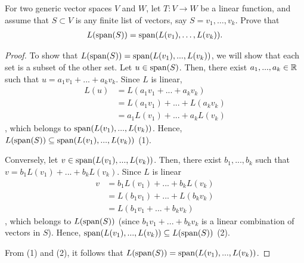 \begin{question}\label{que:LOfSpan}
	\normalfont
	
	For two generic vector spaces $V$ and $W$, let $T:V\to W$ be a linear function, and assume that $S\subset V$ is any finite list of vectors, say $S=v_1,\dots, v_k$.  Prove that
	\begin{align*}
		L(\textnormal{span}(S)) = \textnormal{span}(L(v_1),\dots, L(v_k) ). 
	\end{align*}
\end{question}

\begin{proof}
	\renewcommand{\qedsymbol}{$\blacksquare$}
	To show that $L(\textnormal{span}(S))=\textnormal{span}(L(v_1),...,L(v_k))$, we will show that each set is a subset of the other set.
	Let $u\in\textnormal{span}(S)$. Then, there exist $a_1,...,a_k\in\mathbb R$ such that $u=a_1v_1+...+a_kv_k$. Since $L$ is linear,
	\begin{equation*}
		\begin{aligned}
			L(u)
			&= L(a_1v_1+...+a_kv_k)\\
			&= L(a_1v_1)+...+L(a_kv_k)\\
			&= a_1L(v_1)+...+a_kL(v_k)
		\end{aligned}
	\end{equation*}
	, which belongs to $\textnormal{span}(L(v_1),...,L(v_k))$. Hence, $L(\textnormal{span}(S))\subseteq\textnormal{span}(L(v_1),...,L(v_k))$ (1).

	Conversely, let $v\in\textnormal{span}(L(v_1),...,L(v_k))$. Then, there exist $b_1,...,b_k$ such that $v=b_1L(v_1)+...+b_kL(v_k)$. Since $L$ is linear
	\begin{equation*}
		\begin{aligned}
			v
			&= b_1L(v_1)+...+b_kL(v_k)\\
			&= L(b_1v_1)+...+L(b_kv_k)\\
			&= L(b_1v_1+...+b_kv_k)
		\end{aligned}
	\end{equation*}
	, which belongs to $L(\textnormal{span}(S))$ (since $b_1v_1+...+b_kv_k$ is a linear combination of vectors in $S$). Hence, $\textnormal{span}(L(v_1),...,L(v_k))\subseteq L(\textnormal{span}(S))$ (2).

	From (1) and (2), it follows that $L(\textnormal{span}(S))=\textnormal{span}(L(v_1),...,L(v_k))$.
\end{proof}